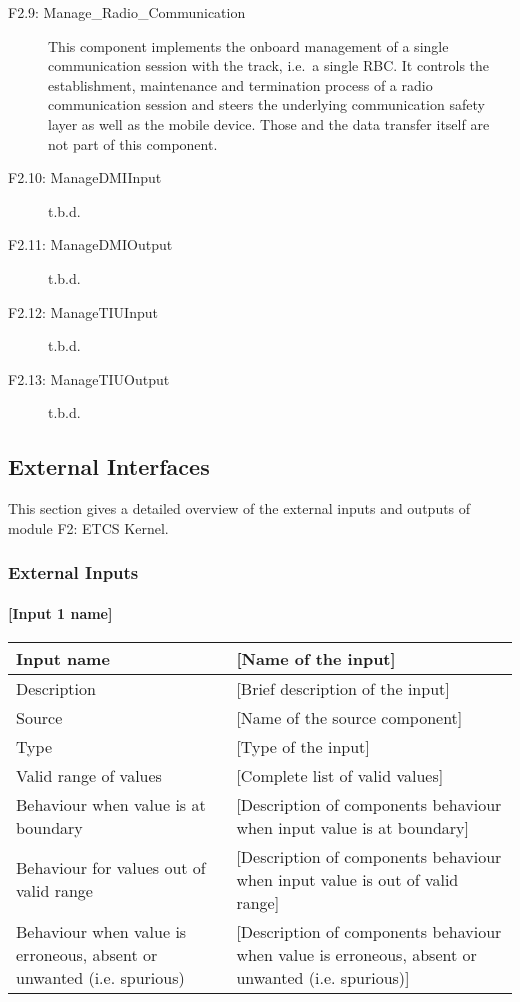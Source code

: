 \begin{description}
\item[F2.9: Manage\_Radio\_Communication] This component implements the onboard management of a single communication session with the track, i.e.~a single RBC. It controls the establishment, maintenance and termination process of a radio communication session and steers the underlying communication safety layer as well as the mobile device. Those and the data transfer itself are not part of this component.
\item[F2.10: ManageDMIInput] t.b.d.
\item[F2.11: ManageDMIOutput] t.b.d.
\item[F2.12: ManageTIUInput] t.b.d.
\item[F2.13: ManageTIUOutput] t.b.d.
\end{description}


\subsection{External Interfaces}
This section gives a detailed overview of the external inputs and outputs of module F2: ETCS Kernel.

\subsubsection{External Inputs}

\paragraph{[Input 1 name]}

\begin{longtable}{p{}p{}}
\toprule
Input name				& [Name of the input] \\
\midrule
Description				& [Brief description of the input] \\
\midrule
Source					& [Name of the source component] \\ 
\midrule
Type					& [Type of the input] \\
\midrule
Valid range of values	& [Complete list of valid values] \\
\midrule
Behaviour when value is at boundary	& [Description of components behaviour when input value is at boundary] \\
\midrule
Behaviour for values out of valid range	& [Description of components behaviour when input value is out of valid range] \\
\midrule
Behaviour when value is erroneous, absent or unwanted (i.e. spurious) & [Description of components behaviour when value is erroneous, absent or unwanted (i.e. spurious)] \\
\bottomrule
\end{longtable}

